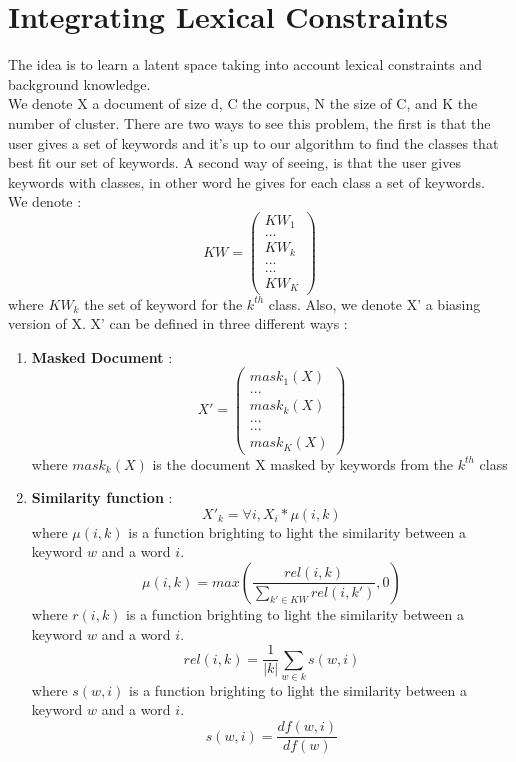 \section{Integrating Lexical Constraints}
The idea is to learn a latent space taking into account lexical constraints and
background knowledge.
\\We denote  X a document of size d,
C the corpus, N the size of C, and K the number of cluster.
There are two ways to see this problem, the first is that the user gives a set 
of keywords and it's up to our algorithm to find the classes that best fit our 
set of keywords. A second way of seeing, is that the user gives keywords with 
classes, in other word he gives for each class a set of keywords.\\
We denote :
\begin{equation}
KW = \begin{pmatrix}KW_1  \\ ... \\ KW_k \\ ...\\ ... \\ KW_{K}\end{pmatrix}
\end{equation}
where $KW_k$ the set of keyword for the $k^{th}$ class. Also, we denote X' a biasing
version of X. X' can be defined in three different ways :
\begin{enumerate}
\item \textbf{Masked Document} :
\begin{equation}
X' = \begin{pmatrix}mask_1(X)  \\ ... \\ mask_k(X) \\ ...\\ ... \\ mask_K(X)\end{pmatrix}
\end{equation}
where $mask_k(X)$ is the document X masked by keywords from the $k^{th}$ class
\item \textbf{Similarity function} :
\begin{equation}
   X'_k = \forall i, X_i * \mu(i,k) 
\end{equation}
where $\mu(i,k)$ is a function brighting to light the similarity between a keyword $w$ and a word $i$.
\begin{equation}
  \mu(i,k) = max \left(\frac{rel(i,k)}{\sum\limits_{k' \in KW}rel(i,k')}, 0\right)
\end{equation}
where $r(i,k)$ is a function brighting to light the similarity between a keyword $w$ and a word $i$.
\begin{equation}
  rel(i,k) = \frac{1}{|k|} \sum\limits_{w \in k} s(w,i)
\end{equation}
where $s(w,i)$ is a function brighting to light the similarity between a keyword $w$ and a word $i$.
\begin{equation}\label{sim}
s(w,i) = \frac{df(w,i)}{df(w)}
\end{equation}
\end{enumerate}
